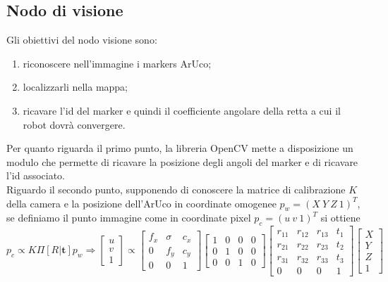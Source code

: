 \subsection{Nodo di visione}
Gli obiettivi del nodo visione sono:
\begin{enumerate}
  \item riconoscere nell'immagine i markers ArUco;
  \item localizzarli nella mappa;
  \item ricavare l'id del marker e quindi il coefficiente angolare della retta a cui il robot dovrà convergere.
\end{enumerate}
  Per quanto riguarda il primo punto, la libreria OpenCV \cite{opencv_library} mette a disposizione un modulo che permette di ricavare la posizione degli angoli del 
  marker e di ricavare l'id associato. \\
  Riguardo il secondo punto, supponendo di conoscere la matrice di calibrazione $K$ della camera \cite{multiple_view} e la posizione dell'ArUco in coordinate omogenee 
  $p_w = (X \: Y \: Z \: 1 )^T$, se definiamo il punto immagine come in coordinate pixel $ p_c =  (u \: v \: 1)^T$ si ottiene 
    \begin{equation}
    p_c \propto K \Pi [R | \boldsymbol{t}] p_w  \Rightarrow
     \begin{bmatrix}
           u \\
           v \\
           1
        \end{bmatrix}
         \propto 
         \begin{bmatrix}
           f_x & \sigma & c_x \\
           0 & f_y & c_y \\
           0 & 0 & 1 
         \end{bmatrix}
          \begin{bmatrix}
           1 & 0 & 0 & 0 \\
           0 & 1 & 0 & 0 \\
           0 & 0 & 1 & 0
         \end{bmatrix}
         \begin{bmatrix}
           r_{11} & r_{12} & r_{13} & t_1 \\
           r_{21} & r_{22} & r_{23} & t_2 \\
           r_{31} & r_{32} & r_{33} & t_3  \\
           0 & 0 & 0 & 1
         \end{bmatrix}
         \begin{bmatrix}
           X \\
           Y \\
           Z \\
           1
    \end{bmatrix}
  \end{equation}
